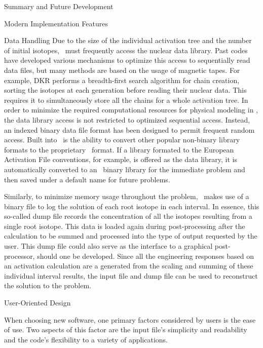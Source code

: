 \begin{chapter}{Summary and Future Development}
\begin{section}{Modern Implementation Features\label{sec:summary.modern}}
    \begin{subsection}{Data Handling}
      Due to the size of the individual activation tree and the number
      of initial isotopes, \ALARA\  must frequently access the nuclear
      data library.  Past codes have developed various mechanisms to
      optimize this access to sequentially read data files, but many
      methods are based on the usage of magnetic tapes.  For example,
      DKR performs a breadth-first search algorithm for chain
      creation, sorting the isotopes at each generation before reading
      their nuclear data.  This requires it to simultaneously store
      all the chains for a whole activation tree.  In order to
      minimize the required computational resources for physical
      modeling in \ALARA, the data library access is not restricted
      to optimized sequential access.  Instead, an indexed binary data
      file format has been designed to permit frequent random access.
      Built into \ALARA\   is the ability to convert other popular
      non-binary library formats to the proprietary \ALARA\  format.
      If a library formated to the European Activation File\cite{EAF}
      conventions, for example, is offered as the data library, it is
      automatically converted to an \ALARA\  binary library for the
      immediate problem and then saved under a default name for future
      problems.
      
      Similarly, to minimize memory usage throughout the problem,
      \ALARA\  makes use of a binary file to log the solution of each
      root isotope in each interval.  In essence, this so-called dump
      file records the concentration of all the isotopes resulting
      from a single root isotope.  This data is loaded again during
      post-processing after the calculation to be summed and processed
      into the type of output requested by the user.  This dump file
      could also serve as the interface to a graphical post-processor,
      should one be developed.  Since all the engineering responses
      based on an activation calculation are a generated from the
      scaling and summing of these individual interval results, the
      input file and dump file can be used to reconstruct the solution
      to the problem.
    \end{subsection}
    
    \begin{subsection}{User-Oriented Design}
      
      When choosing new software, one primary factors considered by
      users is the ease of use.  Two aspects of this factor are the
      input file's simplicity and readability and the code's
      flexibility to a variety of applications.
      

\end{subsection}
\end{section}
\end{chapter}
